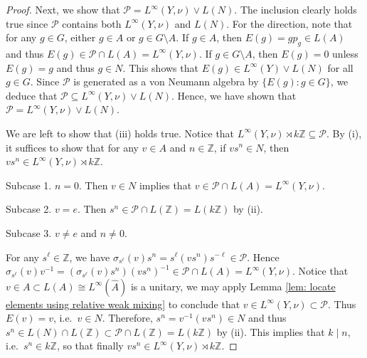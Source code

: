 \documentclass[11pt]{amsart}
\theoremstyle{plain}
\theoremstyle{definition}
\theoremstyle{remark}
\numberwithin{equation}{section}
\begin{document}
\begin{proof}
Next, we show that $\mathcal{P}=L^{\infty}(Y, \nu)\vee L(N)$. The inclusion \say{$\supseteq$} clearly holds true since $\mathcal{P}$ contains both $L^{\infty}(Y, \nu)$ and $L(N)$. For the \say{$\subseteq$} direction, note that for any $g\in G$, either $g\in A$ or $g\in G\setminus A$. If $g\in A$, then $E(g)= g p_g\in L(A)$ and thus $E(g)\in \mathcal{P}\cap L(A)=L^{\infty}(Y, \nu)$. If $g\in G\setminus A$, then $E(g)=0$ unless $E(g)=g$ and thus $g\in N$. This shows that $E(g)\in L^{\infty}(Y)\vee L(N)$ for all $g\in G$. Since $\mathcal{P}$ is generated as a von Neumann algebra by $\{E(g): g\in G\}$, we deduce that $\mathcal{P}\subseteq L^{\infty}(Y, \nu)\vee L(N)$. Hence, we have shown that $\mathcal{P}=L^{\infty}(Y, \nu)\vee L(N)$.
\smallskip

We are left to show that (iii) holds true. Notice that $L^{\infty}(Y, \nu)\rtimes k\mathbb{Z}\subseteq \mathcal{P}$. By (i), it suffices to show that for any $v\in A$ and $n\in\mathbb{Z}$, if $vs^n\in N$, then $vs^n\in L^{\infty}(Y, \nu)\rtimes k\mathbb{Z}$.

Subcase 1. $n=0$. Then $v\in N$ implies that $v\in 
\mathcal{P}\cap L(A)=L^{\infty}(Y, \nu)$.

Subcase 2. $v=e$. Then $s^n\in \mathcal{P}\cap L(\mathbb{Z})=L(k\mathbb{Z})$ by (ii).

Subcase 3. $v\neq e$ and $n\neq 0$. 

For any $s^{\ell}\in\mathbb{Z}$, we have $\sigma_{s^{\ell}}(v)s^n=s^{\ell}(vs^n)s^{-\ell}\in \mathcal{P}$. Hence $\sigma_{s^{\ell}}(v)v^{-1}=(\sigma_{s^{\ell}}(v)s^n)(vs^n)^{-1}\in \mathcal{P}\cap L(A)=L^{\infty}(Y, \nu)$. Notice that $v\in A\subset L(A)\cong L^{\infty}(\widehat{A})$ is a unitary, we may apply Lemma \ref{lem: locate elements using relative weak mixing} to conclude that $v\in L^{\infty}(Y, \nu)\subset \mathcal{P}$. Thus $E(v)=v$, i.e.\ $v\in N$. Therefore, $s^n=v^{-1}(vs^n)\in N$ and thus $s^n\in L(N)\cap L(\mathbb{Z})\subset \mathcal{P}\cap L(\mathbb{Z})=L(k\mathbb{Z})$ by (ii). This implies that $k\mid n$, i.e.\ $s^n\in k\mathbb{Z}$, so that finally $vs^n\in L^{\infty}(Y, \nu)\rtimes k\mathbb{Z}$.
\end{proof}
\end{document}
